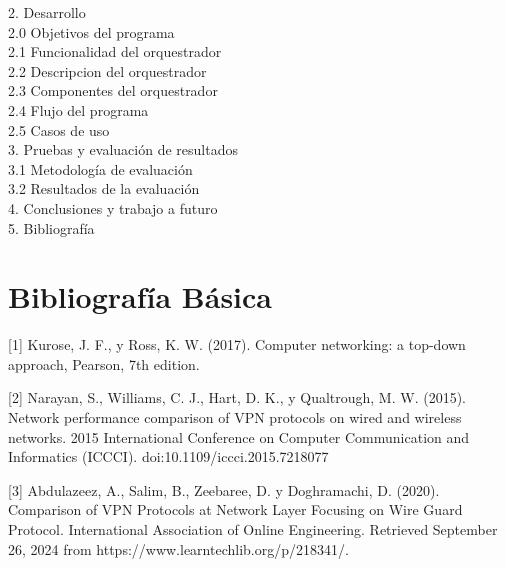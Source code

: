 \documentclass[letterpaper,12pt,oneside]{book}
\begin{document}
\begin{itemize}
\begin{flushleft}
\begin{tabbing}
    2. Desarrollo \> \dotfill  \\

    \hspace{0.5cm}2.0 Objetivos del programa \> \dotfill  \\
    \hspace{0.5cm}2.1 Funcionalidad del orquestrador \> \dotfill  \\
    \hspace{0.5cm}2.2 Descripcion del orquestrador \> \dotfill  \\
    \hspace{0.5cm}2.3 Componentes del orquestrador \> \dotfill  \\
    \hspace{0.5cm}2.4 Flujo del programa \> \dotfill  \\
    \hspace{0.5cm}2.5 Casos de uso \> \dotfill  \\
    
    3. Pruebas y evaluación de resultados \> \dotfill \\
    \hspace{0.5cm}3.1 Metodología de evaluación \>  \\
    \hspace{0.5cm}3.2 Resultados de la evaluación \>  \\
    4. Conclusiones y trabajo a futuro \> \dotfill  \\
    5. Bibliografía \>  \\
    \end{tabbing}
    \end{flushleft}

\section{Bibliografía Básica}
[1] Kurose, J. F., y Ross, K. W. (2017). Computer networking: a top-down approach,
Pearson, 7th edition.

[2] Narayan, S., Williams, C. J., Hart, D. K., y Qualtrough, M. W. (2015). Network performance comparison of VPN protocols on wired and wireless networks. 2015 International Conference on Computer Communication and Informatics (ICCCI). doi:10.1109/iccci.2015.7218077

[3]  Abdulazeez, A., Salim, B., Zeebaree, D. y Doghramachi, D. (2020). Comparison of VPN Protocols at Network Layer Focusing on Wire Guard Protocol. International Association of Online Engineering. Retrieved September 26, 2024 from https://www.learntechlib.org/p/218341/. 


\end{itemize}
\end{document}
